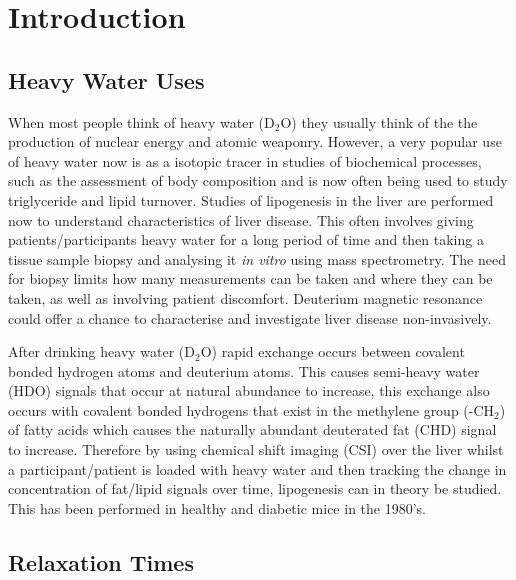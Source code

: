 \documentclass[class=article, crop=false]{standalone}
\begin{document}
 
\label{section:D2O}

\section{Introduction}

\subsection{Heavy Water Uses}

When most people think of heavy water (D$_{2}$O) they usually think of the the production of nuclear energy and atomic weaponry. However, a very popular use of heavy water now is as a isotopic tracer in studies of biochemical processes, such as the assessment of body composition\cite{INTERNATIONALATOMICENERGYAGENCY2011IntroductionSpectrometry} and is now often being used to study triglyceride\cite{Strawford2004AdiposeO} and lipid turnover\cite{Wilkinson2017StableFuture}. Studies of lipogenesis in the liver are performed now to understand characteristics of liver disease\cite{Turner2003MeasurementMIDA}. This often involves giving patients/participants heavy water for a long period of time and then taking a tissue sample biopsy and analysing it \textit{in vitro} using mass spectrometry. The need for biopsy limits how many measurements can be taken and where they can be taken, as well as involving patient discomfort. Deuterium magnetic resonance could offer a chance to characterise and investigate liver disease non-invasively. 

After drinking heavy water (D$_2$O) rapid exchange occurs between covalent bonded hydrogen atoms and deuterium atoms. This causes semi-heavy water (HDO) signals that occur at natural abundance to increase, this exchange also occurs with covalent bonded hydrogens that exist in the methylene group (-CH$_2$) of fatty acids which causes the naturally abundant deuterated fat (CHD) signal to increase. Therefore by using chemical shift imaging (CSI) over the liver whilst a participant/patient is loaded with heavy water and then tracking the change in concentration of fat/lipid signals over time, lipogenesis can in theory be studied. This has been performed in healthy and diabetic mice in the 1980's\cite{Brereton1986PreliminarySpectroscopy,Brereton1989TheMice}.

\subsection{Relaxation Times}
\end{document}
